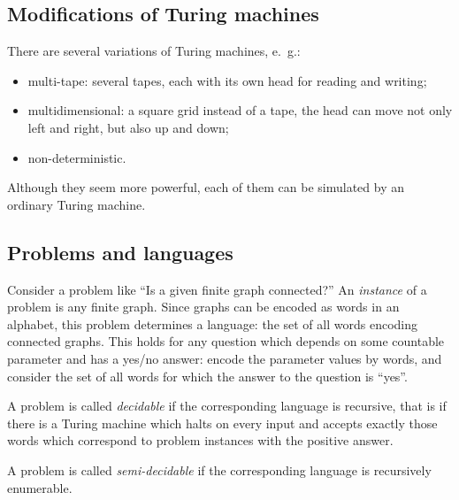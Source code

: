 \begin{page}
\setcounter{section}{8}
\setcounter{subsection}{3}
\setcounter{dfn}{4}
\label{portion:1338}

\subsection{Modifications of Turing machines}
There are several variations of Turing machines, e.~g.:
\begin{itemize}
\item
multi-tape: several tapes, each with its own head for reading and writing;
\item
multidimensional: a square grid instead of a tape, the head can move not only left and right, but also up and down;
\item
non-deterministic.
\end{itemize}
Although they seem more powerful, each of them can be simulated by an ordinary Turing machine.




\end{page}

\begin{page}
\setcounter{section}{8}
\setcounter{subsection}{3}
\setcounter{dfn}{4}
\label{portion:1340}

\subsection{Problems and languages}
Consider a problem like ``Is a given finite graph connected?''
An \emph{instance} of a problem is any finite graph.
Since graphs can be encoded as words in an alphabet, this problem determines a language:
the set of all words encoding connected graphs.
This holds for any question which depends on some countable parameter and has a yes/no answer:
encode the parameter values by words, and consider the set of all words for which the answer to the question is ``yes''.


\end{page}

\begin{page}
\setcounter{section}{8}
\setcounter{subsection}{3}
\setcounter{dfn}{5}
\label{portion:1342}

\begin{dfn}
A problem is called \emph{decidable} if the corresponding language is recursive,
that is if there is a Turing machine which halts on every input
and accepts exactly those words which correspond to problem instances with the positive answer.

A problem is called \emph{semi-decidable} if the corresponding language is recursively enumerable.
\end{dfn}

\end{page}

